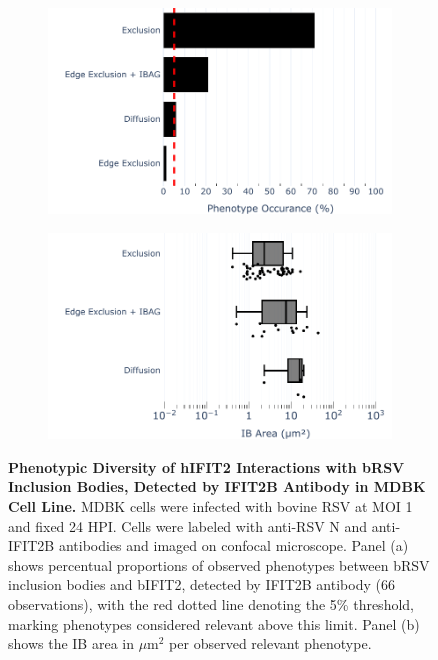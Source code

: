 \begin{figure}
    \begin{subfigure}{0.495\textwidth}
        \caption{}
        \includegraphics[width=1\linewidth]{08. Chapter 3/Figs/02. Infection/02. IFIT2/02. IFIT2B/10. bar_i2b_mdbk.pdf} 
    \end{subfigure}
    \begin{subfigure}{0.495\textwidth}
        \caption{}
        \includegraphics[width=1\linewidth]{08. Chapter 3/Figs/02. Infection/02. IFIT2/02. IFIT2B/11. box_i2b_mdbk.pdf}
    \end{subfigure}
    \caption[Phenotypic Diversity of hIFIT2 Interactions with bRSV Inclusion Bodies, Detected by IFIT2B Antibody in MDBK Cell Line.]{\textbf{Phenotypic Diversity of hIFIT2 Interactions with bRSV Inclusion Bodies, Detected by IFIT2B Antibody in MDBK Cell Line.} MDBK cells were infected with bovine RSV at MOI 1 and fixed 24 HPI. Cells were labeled with anti-RSV N and anti-IFIT2B antibodies and imaged on confocal microscope. Panel (a) shows percentual proportions of observed phenotypes between bRSV inclusion bodies and bIFIT2, detected by IFIT2B antibody (66 observations), with the red dotted line denoting the 5\% threshold, marking phenotypes considered relevant above this limit. Panel (b) shows the IB area in \(\mu \mbox{m}^2\) per observed relevant phenotype.}
    \label{fig:Phenotypic Diversity of hIFIT2 Interactions with bRSV Inclusion Bodies, Detected by IFIT2B Antibody in MDBK Cell Line}
\end{figure}

